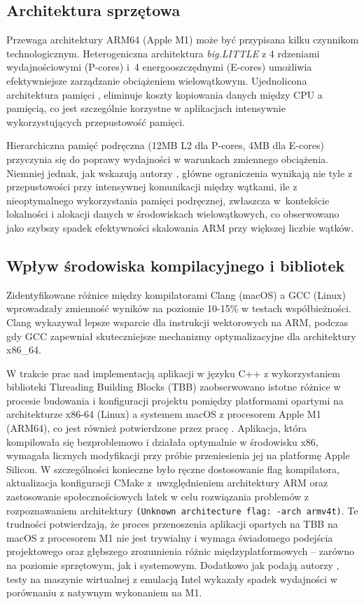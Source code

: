 \subsection{Architektura sprzętowa}

Przewaga architektury ARM64 (Apple M1) może być przypisana kilku czynnikom technologicznym. Heterogeniczna architektura \emph{big.LITTLE} z 4 rdzeniami wydajnościowymi (P-cores) i~4 energooszczędnymi (E-cores) umożliwia efektywniejsze zarządzanie obciążeniem wielowątkowym. Ujednolicona architektura pamięci , eliminuje koszty kopiowania danych między CPU a pamięcią, co jest szczególnie korzystne w aplikacjach intensywnie wykorzystujących przepustowość pamięci.

Hierarchiczna pamięć podręczna (12MB L2 dla P-cores, 4MB dla E-cores) przyczynia się do poprawy wydajności w warunkach zmiennego obciążenia. Niemniej jednak, jak wskazują autorzy \cite{arml2c}, główne ograniczenia wynikają nie tyle z przepustowości przy intensywnej komunikacji między wątkami, ile z nieoptymalnego wykorzystania pamięci podręcznej, zwłaszcza w~kontekście lokalności i alokacji danych w środowiskach wielowątkowych, co obserwowano jako szybszy spadek efektywności skalowania ARM przy większej liczbie wątków.

\subsection{Wpływ środowiska kompilacyjnego i bibliotek}

Zidentyfikowane różnice między kompilatorami Clang (macOS) a GCC (Linux) wprowadzały zmienność wyników na poziomie 10-15\% w testach współbieżności. Clang wykazywał lepsze wsparcie dla instrukcji wektorowych na ARM, podczas gdy GCC zapewniał skuteczniejsze mechanizmy optymalizacyjne dla architektury x86\_64. 

W trakcie prac nad implementacją aplikacji w języku C++ z wykorzystaniem biblioteki Threading Building Blocks (TBB) zaobserwowano istotne różnice w procesie budowania i konfiguracji projektu pomiędzy platformami opartymi na architekturze x86-64 (Linux) a systemem macOS z procesorem Apple M1 (ARM64), co jest również potwierdzone przez pracę \cite{ARMTBB}. Aplikacja, która kompilowała się bezproblemowo i działała optymalnie w środowisku x86, wymagała licznych modyfikacji przy próbie przeniesienia jej na platformę Apple Silicon. W szczególności konieczne było ręczne dostosowanie flag kompilatora, aktualizacja konfiguracji CMake z~uwzględnieniem architektury ARM oraz zastosowanie społecznościowych łatek w celu rozwiązania problemów z rozpoznawaniem architektury \texttt{(Unknown architecture flag: -arch armv4t)}. Te trudności potwierdzają, że proces przenoszenia aplikacji opartych na TBB na \mbox{macOS} z procesorem M1 nie jest trywialny i wymaga świadomego podejścia projektowego oraz głębszego zrozumienia różnic międzyplatformowych -- zarówno na poziomie sprzętowym, jak i systemowym. Dodatkowo jak podają autorzy \cite{TBBARMCONCLUSIONS}, testy na maszynie wirtualnej z emulacją Intel wykazały spadek wydajności w porównaniu z natywnym wykonaniem na M1.

